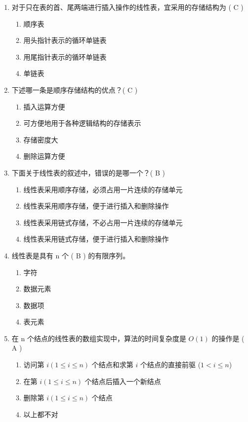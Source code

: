 \documentclass[12pt, a4paper]{article}
\begin{document}
\begin{enumerate}[label=\arabic*.]
    \item 对于只在表的首、尾两端进行插入操作的线性表，宜采用的存储结构为 ( C )
    \begin{enumerate}
        \item 顺序表
        \item 用头指针表示的循环单链表
        \item 用尾指针表示的循环单链表
        \item 单链表
    \end{enumerate}

    \item 下述哪一条是顺序存储结构的优点？( C )
    \begin{enumerate}
        \item 插入运算方便
        \item 可方便地用于各种逻辑结构的存储表示
        \item 存储密度大
        \item 删除运算方便
    \end{enumerate}

    \item 下面关于线性表的叙述中，错误的是哪一个？( B )
    \begin{enumerate}
        \item 线性表采用顺序存储，必须占用一片连续的存储单元
        \item 线性表采用顺序存储，便于进行插入和删除操作
        \item 线性表采用链式存储，不必占用一片连续的存储单元
        \item 线性表采用链式存储，便于进行插入和删除操作
    \end{enumerate}

    \item 线性表是具有 n 个 ( B ) 的有限序列。
    \begin{enumerate}
        \item 字符
        \item 数据元素
        \item 数据项
        \item 表元素
    \end{enumerate}

    \item 在 n 个结点的线性表的数组实现中，算法的时间复杂度是 $O(1)$ 的操作是 ( A )
    \begin{enumerate}
        \item 访问第 $i (1 \le i \le n)$ 个结点和求第 $i$ 个结点的直接前驱 ($1 < i \le n$)
        \item 在第 $i (1 \le i \le n)$ 个结点后插入一个新结点
        \item 删除第 $i (1 \le i \le n)$ 个结点
        \item 以上都不对
    \end{enumerate}


\end{enumerate}
\end{document}
